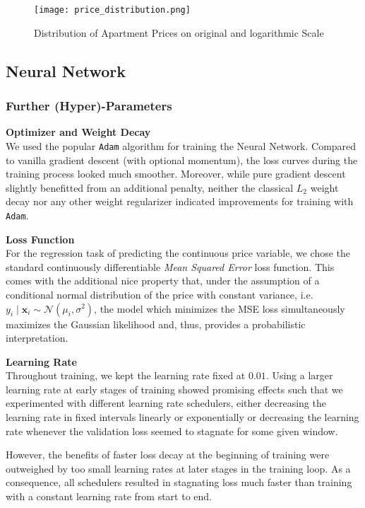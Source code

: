 \begin{figure}[ht]
  \centering
  \texttt{[image: price\_distribution.png]}
  \caption{Distribution of Apartment Prices on original and logarithmic Scale}
  \label{fig:price-distribution}
\end{figure}


\subsection{Neural Network}

\subsubsection{Further (Hyper)-Parameters} \label{appendix:hyperparameters}

\textbf{Optimizer and Weight Decay} \\
We used the popular \texttt{Adam} algorithm \citep{kingma2017} for training the Neural Network.
Compared to vanilla gradient descent (with optional momentum), the loss curves during the training process looked much smoother.
Moreover, while pure gradient descent slightly benefitted from an additional penalty, neither the classical $L_2$ weight decay nor any other weight regularizer indicated improvements for training with \texttt{Adam}.

\textbf{Loss Function} \\
For the regression task of predicting the continuous price variable, we chose the standard continuously differentiable \emph{Mean Squared Error} loss function.
This comes with the additional nice property that, under the assumption of a conditional normal distribution of the price with constant variance, i.e. $y_i \mid \mathbf{x}_i \sim \mathcal{N} \left(\mu_i, \sigma^2 \right)$, the model which minimizes the MSE loss simultaneously maximizes the Gaussian likelihood and, thus, provides a probabilistic interpretation.

\textbf{Learning Rate} \\
Throughout training, we kept the learning rate fixed at $0.01$.
Using a larger learning rate at early stages of training showed promising effects such that we experimented with different learning rate schedulers, either decreasing the learning rate in fixed intervals linearly or exponentially or decreasing the learning rate whenever the validation loss seemed to stagnate for some given window.

However, the benefits of faster loss decay at the beginning of training were outweighed by too small learning rates at later stages in the training loop.
As a consequence, all schedulers resulted in stagnating loss much faster than training with a constant learning rate from start to end.

